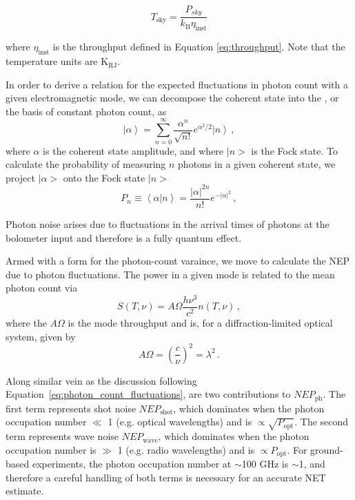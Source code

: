 \begin{equation}
    T_{\mathrm{sky}} = \frac{P_{sky}}{k_{\mathrm{B}} \eta_{\mathrm{inst}}}
    \label{eq:sky_temp}
\end{equation}

\noindent
where $\eta_{\mathrm{inst}}$ is the throughput defined in Equation \ref{eq:throughput}. Note that the temperature units are $\mathrm{K_{RJ}}$.

In order to derive a relation for the expected fluctuations in photon count with a given electromagnetic mode, we can decompose the coherent state into the , or the basis of constant photon count, as
\begin{equation}
    \left| \alpha \right> = \sum_{n = 0}^{\infty} \frac{\alpha^{n}}{\sqrt{n !}} e^{\alpha^{2} / 2} \left| n \right> \, ,
\end{equation}
where $\alpha$ is the coherent state amplitude, and where $| n >$ is the Fock state. To calculate the probability of measuring $n$ photons in a given coherent state, we project $| \alpha >$ onto the Fock state $| n >$
\begin{equation}
    P_{n} \equiv \left< \alpha | n \right> = \frac{\left| \alpha \right|^{2 n}}{n !} e^{- \left| \alpha \right|^{2}} \, ,
    \label{eq:photon_count_probablity_distribution}
\end{equation}

Photon noise arises due to fluctuations in the arrival times of photons at the bolometer input and therefore is a fully quantum effect. 

Armed with a form for the photon-count varaince, we move to calculate the NEP due to photon fluctuations. The power in a given mode is related to the mean photon count via
\begin{equation}
    S(T, \nu) = A \Omega \frac{h \nu^{3}}{c^{2}} n(T, \nu) \, ,
    \label{eq:relation_photon_occupation_power}
\end{equation}
where the $A \Omega$ is the mode throughput and is, for a diffraction-limited optical system, given by
\begin{equation}
    A \Omega = \left( \frac{c}{\nu} \right)^{2} = \lambda^{2} \, .
    \label{eq:single_mode_throughput_etendue}
\end{equation}

Along similar vein as the discussion following Equation~\ref{eq:photon_count_fluctuations}, are two contributions to $NEP_{\mathrm{ph}}$. The first term represents shot noise $NEP_{\mathrm{shot}}$, which dominates when the photon occupation number $\ll$ 1 (e.g. optical wavelengths) and is $\propto \sqrt{P_{\mathrm{opt}}}$. The second term represents wave noise $NEP_{\mathrm{wave}}$, which dominates when the photon occupation number is $\gg$ 1 (e.g. radio wavelengths) and is $\propto P_{\mathrm{opt}}$. For ground-based experiments, the photon occupation number at $\sim$100 GHz is $\sim$1, and therefore a careful handling of both terms is necessary for an accurate NET estimate.

